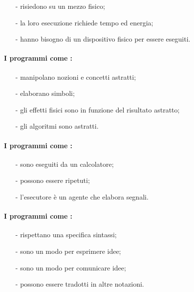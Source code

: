 \begin{itemize}
    \item [-] risiedono su un mezzo fisico;
    \item [-] la loro esecuzione richiede tempo ed energia;
    \item [-] hanno bisogno di un dispositivo fisico per essere
    eseguiti.
\end{itemize}

\paragraph{I programmi come :}

\begin{itemize}
    \item [-] manipolano nozioni e concetti astratti;
    \item [-] elaborano simboli;
    \item [-] gli effetti fisici sono in funzione del risultato
    astratto;
    \item [-] gli algoritmi sono astratti.
\end{itemize}

\paragraph{I programmi come :}

\begin{itemize}
    \item [-] sono eseguiti da un calcolatore;
    \item [-] possono essere ripetuti;
    \item [-] l'esecutore è un agente che elabora segnali.
\end{itemize}

\paragraph{I programmi come :}

\begin{itemize}
    \item [-] rispettano una specifica sintassi;
    \item [-] sono un modo per esprimere idee;
    \item [-] sono un modo per comunicare idee;
    \item [-] possono essere tradotti in altre notazioni.
\end{itemize}



